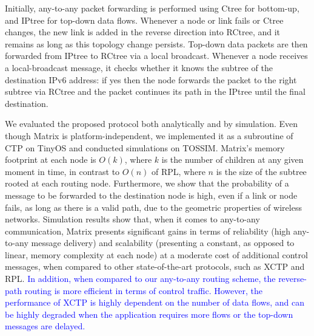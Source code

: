 Initially, any-to-any packet forwarding is performed using Ctree for bottom-up, and IPtree for top-down data flows. Whenever a node or link fails or Ctree changes, the new link is added in the reverse direction into RCtree, and it remains as long as this topology change persists. Top-down data packets are then forwarded from IPtree to RCtree via a local broadcast. Whenever a node receives a local-broadcast message, it checks whether it knows the subtree of the destination IPv6 address: if yes then the node forwards the packet to the right subtree via RCtree and the packet continues its path in the IPtree until the final destination.

We evaluated the proposed protocol both analytically and by simulation. Even though Matrix is platform-independent, we implemented it as a subroutine of CTP on TinyOS and conducted simulations on TOSSIM.  Matrix's memory footprint at each node is $O(k)$, where $k$ is the number of children at any given moment in time, in contrast to $O(n)$ of RPL, where $n$ is the size of the subtree rooted at each routing node. Furthermore, we show that the probability of a message to be forwarded to the destination node is high, even if a link or node fails, as long as there is a valid path, due to the geometric properties of wireless networks. Simulation results show that, when it comes to any-to-any communication, Matrix presents significant gains in terms of reliability (high any-to-any message delivery) and scalability (presenting a constant, as opposed to linear, memory complexity at each node) at a moderate cost of additional control messages, when compared to other state-of-the-art protocols, such as XCTP and RPL. \textcolor{blue}{In addition, when compared to our any-to-any routing scheme, the reverse-path routing is more efficient in terms of control traffic. However, the performance of XCTP is highly dependent on the number of data flows, and can be highly degraded when the application requires more flows or the top-down messages are delayed.}

